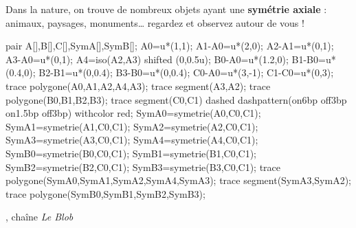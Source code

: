 
\vfill
\begin{debat} 
   Dans la nature, on trouve de nombreux objets ayant une {\bf symétrie axiale} : animaux, paysages, monuments\dots{} regardez et observez autour de vous !
   \begin{center}
      \begin{Geometrie}
         pair A[],B[],C[],SymA[],SymB[];
         A0=u*(1,1);
         A1-A0=u*(2,0);
         A2-A1=u*(0,1);
         A3-A0=u*(0,1);
         A4=iso(A2,A3) shifted (0,0.5u);
         B0-A0=u*(1.2,0);
         B1-B0=u*(0.4,0);
         B2-B1=u*(0,0.4);
         B3-B0=u*(0,0.4);
         C0-A0=u*(3,-1);
         C1-C0=u*(0,3);
         trace polygone(A0,A1,A2,A4,A3);
         trace segment(A3,A2);
         trace polygone(B0,B1,B2,B3);
         trace segment(C0,C1) dashed dashpattern(on6bp off3bp on1.5bp off3bp) withcolor red;
         SymA0=symetrie(A0,C0,C1);
         SymA1=symetrie(A1,C0,C1);
         SymA2=symetrie(A2,C0,C1);
         SymA3=symetrie(A3,C0,C1);
         SymA4=symetrie(A4,C0,C1);
         SymB0=symetrie(B0,C0,C1);
         SymB1=symetrie(B1,C0,C1);
         SymB2=symetrie(B2,C0,C1);
         SymB3=symetrie(B3,C0,C1);
         trace polygone(SymA0,SymA1,SymA2,SymA4,SymA3);
         trace segment(SymA3,SymA2);
         trace polygone(SymB0,SymB1,SymB2,SymB3);
      \end{Geometrie}
   \end{center}
   \vfill
   \begin{cadre}[B2][J4]
      \begin{center}
         , chaîne {\it Le Blob}
      \end{center}
   \end{cadre}
\end{debat}